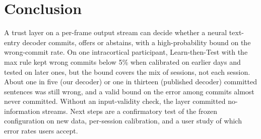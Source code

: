 \section{Conclusion}
\label{sec:conclusion}

A trust layer on a per-frame output stream can decide whether a neural text-entry decoder commits, offers or abstains, with a high-probability bound on the wrong-commit rate. On one intracortical participant, Learn-then-Test with the max rule kept wrong commits below 5\% when calibrated on earlier days and tested on later ones, but the bound covers the mix of sessions, not each session. About one in five (our decoder) or one in thirteen (published decoder) committed sentences was still wrong, and a valid bound on the error among commits almost never committed. Without an input-validity check, the layer committed no-information streams. Next steps are a confirmatory test of the frozen configuration on new data, per-session calibration, and a user study of which error rates users accept.
